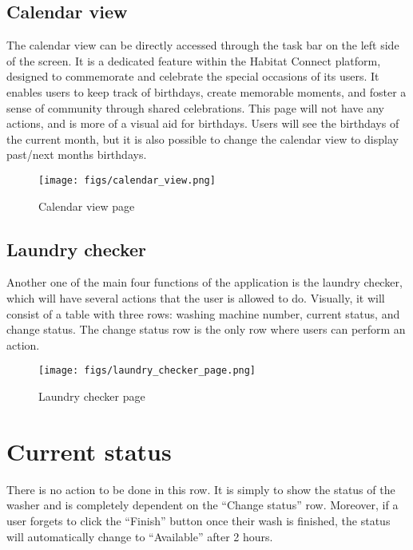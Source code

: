 \documentclass[conference]{IEEEtran}
\begin{document}
\subsection{Calendar view}
The calendar view can be directly accessed through the task bar on the left side of the screen. It is a dedicated feature within the Habitat Connect platform, designed to commemorate and celebrate the special occasions of its users. It enables users to keep track of birthdays, create memorable moments, and foster a sense of community through shared celebrations. This page will not have any actions, and is more of a visual aid for birthdays. Users will see the birthdays of the current month, but it is also possible to change the calendar view to display past/next months birthdays.
    \begin{figure}[H]
    \centering
    \texttt{[image: figs/calendar\_view.png]}
    \caption{Calendar view page}
    \label{fig:Calendar view page}
    \end{figure}


\subsection{Laundry checker}
Another one of the main four functions of the application is the laundry checker, which will have several actions that the user is allowed to do. Visually, it will consist of a table with three rows: washing machine number, current status, and change status. The change status row is the only row where users can perform an action.
    \begin{figure}[H]
    \centering
    \texttt{[image: figs/laundry\_checker\_page.png]}
    \caption{Laundry checker page}
    \label{fig:Laundry checker page}
    \end{figure}

\section*{Current status}
There is no action to be done in this row. It is simply to show the status of the washer and is completely dependent on the “Change status” row. Moreover, if a user forgets to click the “Finish” button once their wash is finished, the status will automatically change to “Available” after 2 hours.
\end{document}
